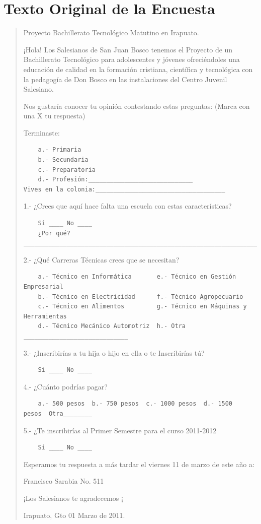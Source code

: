 \section{Texto Original de la Encuesta}
\begin{quote}
Proyecto Bachillerato Tecnológico Matutino en Irapuato.

\footnotesize
¡Hola! Los Salesianos de San Juan Bosco tenemos el Proyecto de un Bachillerato Tecnológico  para adolescentes  y jóvenes ofreciéndoles una educación de calidad en la formación cristiana, científica y tecnológica con la pedagogía de Don Bosco en las instalaciones del  Centro Juvenil Salesiano.

Nos gustaría conocer  tu opinión contestando estas preguntas: (Marca con una X tu respuesta)

Terminaste:
\begin{verbatim}
    a.- Primaria
    b.- Secundaria
    c.- Preparatoria
    d.- Profesión:_____________________________
Vives en la colonia:____________________________________
\end{verbatim}

1.- ¿Crees que aquí  hace falta una escuela con estas características?
\begin{verbatim}
    Sí ____ No ____
    ¿Por qué? _____________________________________________________________________
\end{verbatim}

2.- ¿Qué Carreras Técnicas crees que se necesitan?
\begin{verbatim}
    a.- Técnico en Informática       e.- Técnico en Gestión Empresarial
    b.- Técnico en Electricidad      f.- Técnico Agropecuario
    c.- Técnico en Alimentos         g.- Técnico en Máquinas y Herramientas
    d.- Técnico Mecánico Automotriz  h.- Otra _____________________________
\end{verbatim}

3.- ¿Inscribirías a tu hija o hijo en ella o te Inscribirías tú?
\begin{verbatim}
    Si ____ No ____
\end{verbatim}

4.- ¿Cuánto  podrías pagar?
\begin{verbatim}
    a.- 500 pesos  b.- 750 pesos  c.- 1000 pesos  d.- 1500  pesos  Otra________            
\end{verbatim}

5.- ¿Te inscribirías al Primer Semestre para el curso 2011-2012
\begin{verbatim}
    Sí ____ No ____
\end{verbatim}

Esperamos tu respuesta a más tardar el viernes 11 de marzo de este año a:

Francisco  Sarabia No.  511

\begin{center}
¡Los Salesianos te agradecemos ¡
\end{center}

\begin{flushright}
Irapuato,  Gto  01 Marzo de 2011.
\end{flushright}
\end{quote}
